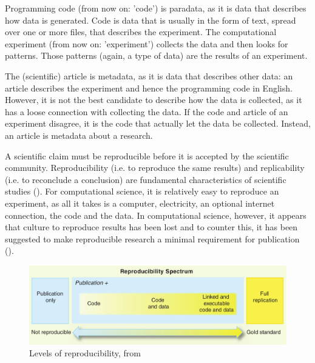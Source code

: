 Programming code (from now on: 'code') is paradata, 
as it is data that describes how data is generated.
Code is data that is usually in the form of text, 
spread over one or more files, that describes the experiment.
The computational experiment (from now on: 'experiment') collects the data
and then looks for patterns.
Those patterns (again, a type of data) are the results of an experiment.

The (scientific) article is metadata, as it is data that describes other data:
an article describes the
experiment and hence the programming
code in English. However, it is not the best
candidate to describe how the data is collected,
as it has a loose connection with collecting the data.
If the code and article of an experiment disagree,
it is the code that actually let the data be collected.  
Instead, an article is metadata about a research.


A scientific claim must be reproducible before it is accepted
by the scientific community.
Reproducibility (i.e. to reproduce the same results) 
and replicability (i.e. to reconclude a conclusion)
are fundamental characteristics of scientific studies (\cite{patil2019visual}).
For computational science, it is relatively easy to 
reproduce an experiment, as all it takes is a computer, electricity,
an optional internet connection, the code and the data.
In computational science, however, it appears that 
culture to reproduce results has been lost 
and to counter this, it has been suggested to make
reproducible research a minimal requirement for 
publication (\cite{peng2011reproducible}).


\begin{figure}[!htbp]
  \centering
  \includegraphics[width=\linewidth]{peng2011reproducible_fig_1.png}
  \caption{
    Levels of reproducibility, from \cite{peng2011reproducible}
  }
  \label{fig:peng2011reproducible}
\end{figure}

